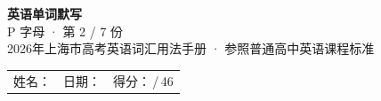 \documentclass[10pt,a4paper]{article}
\begin{document}
\pagestyle{plain}

\begin{center}
{\LARGE\bfseries 英语单词默写}\\[0.22em]
{\large P 字母 · 第 2 / 7 份}\\[0.18em]
{\small 2026年上海市高考英语词汇用法手册 · 参照普通高中英语课程标准}
\end{center}

\vspace{0.25em}
\noindent\begin{tabular}{@{}p{}@{}p{}@{}p{}@{}}
姓名：\underline{\hspace{2.0cm}} & 日期：\underline{\hspace{2.0cm}} & 得分：\underline{\hspace{1.3cm}}\,/\,46 \\
\end{tabular}

\vspace{0.3em}

\vspace{0.08em}
\end{document}
